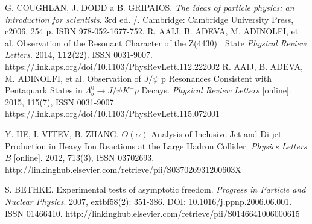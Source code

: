 \documentclass[thesismargins, thesislinespacing]{rnthesis}
\begin{document}
\begin{thebibliography}{}

G. COUGHLAN, J. DODD a B. GRIPAIOS. \textit{The ideas of particle physics: an introduction for scientists}. 3rd ed. /. Cambridge: Cambridge University Press, c2006, 254 p. ISBN 978-052-1677-752.
R. AAIJ, B. ADEVA, M. ADINOLFI, et al. Observation of the Resonant Character of the Z(4430)$^{-}$ State \textit{Physical Review Letters}. 2014, \textbf{112}(22). ISSN 0031-9007. https://link.aps.org/doi/10.1103/PhysRevLett.112.222002
R. AAIJ, B. ADEVA, M. ADINOLFI, et al. Observation of $J / \psi$ p Resonances Consistent with Pentaquark States in $\Lambda_b^0 \rightarrow J / \psi K^{-}p$ Decays. \textit{Physical Review Letters} [online]. 2015, 115(7),  ISSN 0031-9007. https://link.aps.org/doi/10.1103/PhysRevLett.115.072001

Y. HE, I. VITEV, B. ZHANG. 
 $O(\alpha)$ Analysis of Inclusive Jet and Di-jet Production in Heavy Ion Reactions at the Large Hadron Collider. \textit{Physics Letters B} [online]. 2012, 713(3), ISSN 03702693. http://linkinghub.elsevier.com/retrieve/pii/S037026931200603X

S. BETHKE. Experimental tests of asymptotic freedom. \textit{Progress in Particle and Nuclear Physics}. 2007, extbf{58}(2): 351-386. DOI: 10.1016/j.ppnp.2006.06.001. ISSN 01466410.  http://linkinghub.elsevier.com/retrieve/pii/S0146641006000615


\end{thebibliography}
\end{document}
